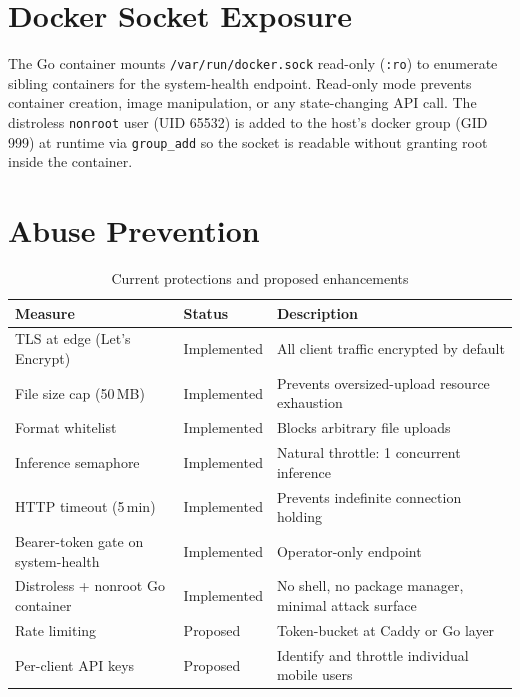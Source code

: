 \section{Docker Socket Exposure}

The Go container mounts \texttt{/var/run/docker.sock} read-only (\texttt{:ro}) to enumerate sibling containers for the system-health endpoint. Read-only mode prevents container creation, image manipulation, or any state-changing API call. The distroless \texttt{nonroot} user (UID 65532) is added to the host's docker group (GID 999) at runtime via \texttt{group\_add} so the socket is readable without granting root inside the container.

\section{Abuse Prevention}

\begin{table}[H]
  \centering
  \caption{Current protections and proposed enhancements}
  \label{tab:security_measures}
  \renewcommand{\arraystretch}{1.3}
  \begin{tabular}{p{5cm}lp{5.5cm}}
    \toprule
    \textbf{Measure} & \textbf{Status} & \textbf{Description} \\
    \midrule
    TLS at edge (Let's Encrypt)            & Implemented & All client traffic encrypted by default \\
    File size cap (50\,MB)                 & Implemented & Prevents oversized-upload resource exhaustion \\
    Format whitelist                       & Implemented & Blocks arbitrary file uploads \\
    Inference semaphore                    & Implemented & Natural throttle: 1 concurrent inference \\
    HTTP timeout (5\,min)                  & Implemented & Prevents indefinite connection holding \\
    Bearer-token gate on system-health     & Implemented & Operator-only endpoint \\
    Distroless + nonroot Go container      & Implemented & No shell, no package manager, minimal attack surface \\
    Rate limiting                          & Proposed    & Token-bucket at Caddy or Go layer \\
    Per-client API keys                    & Proposed    & Identify and throttle individual mobile users \\
    \bottomrule
  \end{tabular}
\end{table}



